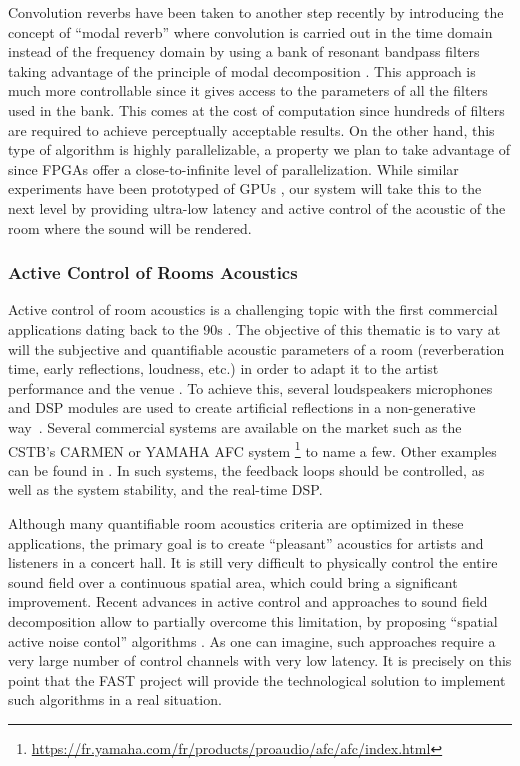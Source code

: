 \documentclass[a4paper,9pt]{extarticle}
\newcommand{\PP}{FAST}
\begin{document}
Convolution reverbs have been taken to another step recently by introducing the concept of ``modal reverb'' \cite{Abel2019} where convolution is carried out in the time domain instead of the frequency domain by using a bank of resonant bandpass filters taking advantage of the principle of modal decomposition \cite{Adrien91}. This approach is much more controllable since it gives access to the parameters of all the filters used in the bank. This comes at the cost of computation since hundreds of filters are required to achieve perceptually acceptable results. On the other hand, this type of algorithm is highly parallelizable, a property we plan to take advantage of since FPGAs offer a close-to-infinite level of parallelization. While similar experiments have been prototyped of GPUs \cite{Skare2019}, our system will take this to the next level by providing ultra-low latency and active control of the acoustic of the room where the sound will be rendered.


\subsubsection{Active Control of Rooms Acoustics}
\label{sec:acr}

Active control of room acoustics is a challenging topic with the first commercial applications dating back to the 90s \cite{griesinger1991improving}. The objective of this thematic is to vary at will the subjective and quantifiable acoustic parameters of a room (reverberation time, early reflections, loudness, etc.) in order to adapt it to the artist performance and the venue \cite{poletti2011active}. To achieve this, several loudspeakers microphones and DSP modules are used to create artificial reflections in a non-generative way~\cite{kleiner1995review}. Several commercial systems are available on the market such as the CSTB's CARMEN \cite{schmich2004carmen} or YAMAHA AFC system \footnote{\href{https://fr.yamaha.com/fr/products/proaudio/afc/afc/index.html}{https://fr.yamaha.com/fr/products/proaudio/afc/afc/index.html}} \cite{miyazaki2003active} to name a few. Other examples can be found in \cite{poletti2011active}.
In such systems, the feedback loops should be controlled, as well as the system stability, and the real-time DSP.

Although many quantifiable room acoustics criteria are optimized in these applications, the primary goal is to create ``pleasant'' acoustics for artists and listeners in a concert hall.  It is still very difficult to physically control the entire sound field over a continuous spatial area, which could bring a significant improvement.
Recent advances in active control and approaches to sound field decomposition \cite{lecomte2018cancellation} allow to partially overcome this limitation, by proposing ``spatial active noise contol'' algorithms \cite{zhang2018active,ito2019threedimensional}.
As one can imagine, such approaches require a very large number of control channels with very low latency.
It is precisely on this point that the \PP{} project will provide the technological solution to implement such algorithms in a real situation.
\end{document}
